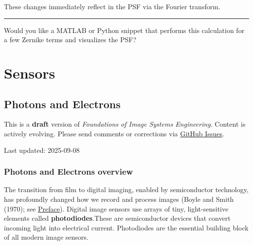 \documentclass[
  letterpaper,
]{book}
\begin{document}
These changes immediately reflect in the PSF via the Fourier transform.

\begin{center}\rule{0.5\linewidth}{0.5pt}\end{center}

Would you like a MATLAB or Python snippet that performs this calculation
for a few Zernike terms and visualizes the PSF?

\part{Sensors}

\chapter{Photons and Electrons}\label{sec-sensors-photons-electrons}

\begin{tcolorbox}[enhanced jigsaw, opacityback=0, breakable, coltitle=black, leftrule=.75mm, left=2mm, colframe=quarto-callout-warning-color-frame, opacitybacktitle=0.6, bottomtitle=1mm, bottomrule=.15mm, toprule=.15mm, title=\textcolor{quarto-callout-warning-color}{\faExclamationTriangle}\hspace{0.5em}{Work in Progress}, titlerule=0mm, toptitle=1mm, colback=white, rightrule=.15mm, colbacktitle=quarto-callout-warning-color!10!white, arc=.35mm]

This is a \textbf{draft} version of \emph{Foundations of Image Systems
Engineering}. Content is actively evolving. Please send comments or
corrections via \href{https://github.com/wandell/FISE-git/issues}{GitHub
Issues}.

Last updated: 2025-09-08

\end{tcolorbox}

\section{Photons and Electrons
overview}\label{sec-sensors-photons-electrons-overview}

The transition from film to digital imaging, enabled by semiconductor
technology, has profoundly changed how we record and process images
(Boyle and Smith (1970); see \hyperref[sec-preface]{Preface}). Digital
image sensors use arrays of tiny, light-sensitive elements called
\textbf{photodiodes}.These are semiconductor devices that convert
incoming light into electrical current. Photodiodes are the essential
building block of all modern image sensors.
\end{document}
